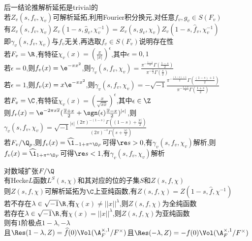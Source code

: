 \begin{zhu}
后一结论推解析延拓是trivial的\\
若$Z_{v}(s,f_{v},\chi_{v})$可解析延拓,利用Fourier积分换元,对任意$f_{v},g_{v}\in S(F_{v})$\\
有$Z_{v}(s,f_{v},\chi_{v})Z_{v}(1-s,\widehat{g}_{v},\chi_{v}^{-1})=Z_{v}(s,g_{v},\chi_{v})Z_{v}(1-s,\widehat{f}_{v},\chi_{v}^{-1})$\\
即$\gamma_{v}(s,f_{v},\chi_{v})$与$f_{v}$无关,再选取$f_{v}\in S(F_{v})$说明存在性\\
若$F_{v}=\R$,有特征$\chi_{v}(x)=(\frac{x}{|x|})^{\epsilon}$,其中$\epsilon=0,1$\\
若$\epsilon=0$,则$f_{v}(x)=\e^{-\pi x^2}$,则$\gamma_{v}(s,f_{v},\chi_{v})=\frac{\pi^{-\frac{1-s}{2}}\Gamma(\frac{1-s}{2})}{\pi^{-\frac{s}{2}}\Gamma(\frac{s}{2})}$\\
若$\epsilon=1$,则$f_{v}(x)=x\e^{-\pi x^2}$,则$\gamma_{v}(s,f_{v},\chi_{v})=-\sqrt{-1}\frac{\pi^{-\frac{(1-s)+1}{2}}\Gamma(\frac{(1-s)+1}{2})}{\pi^{-\frac{1+s}{2}}\Gamma(\frac{1+s}{2})}$\\
若$F_{v}=\C$,有特征$\chi_{v}(x)=(\frac{x}{\sqrt{x\overline{x}}})^{\epsilon}$,其中$\epsilon\in \Z$\\
则$f_{v}(x)=\e^{-2\pi x\overline{x}}(\frac{\overline{x}+x}{2}+\sgn(\epsilon)\frac{\overline{x}-x}{2})^{|\epsilon|}$,则$\gamma_{v}(s,f_{v},\chi_{v})=\sqrt{-1}^{|\epsilon|}\frac{(2\pi)^{-(1-s)}\Gamma((1-s)+\frac{|\epsilon|}{2})}{(2\pi)^{-s}\Gamma(s+\frac{|\epsilon|}{2})}$\\
若$F_{v}/\Q_{p}$,则$f_{v}(x)=\widehat{\1}_{-1+\pi^{n}\O_{F}}$可得$\re s>0$,有$\gamma_{v}(s,f_{v},\chi_{v})$解析,则$f_{v}(x)=\widehat{\1}_{1+\pi^{n}\O_{F}}$可得$\re s<1$,有$\gamma_{v}(s,f_{v},\chi_{v})$解析
\end{zhu}

\begin{dingli}
对数域扩张$F/\Q$\\
有Hecke$L$函数$L^{S}(s,\chi)$和其对应的位的子集$S$和$Z(s,f,\chi)$\\
则$Z(s,f,\chi)$可解析延拓为$\C$上亚纯函数,有$Z(s,f,\chi)=Z(1-s,\widehat{f},\chi^{-1})$\\
若不存在$\lambda\in \sqrt{-1}\R$,有$\chi(x)\neq ||x||^{\lambda}$,则$Z(s,f,\chi)$为全纯函数\\
若存在$\lambda\in \sqrt{-1}\R$,有$\chi(x)= ||x||^{\lambda}$,则$Z(s,f,\chi)$为亚纯函数\\
则有$1$阶极点$1-\lambda,-\lambda$\\
且$\Res(1-\lambda,Z)=\widehat{f}(0)\Vol(\A_{F}^{\times,1}/F^{\times})$且$\Res(-\lambda,Z)=-f(0)\Vol(\A_{F}^{\times,1}/F^{\times})$
\end{dingli}

